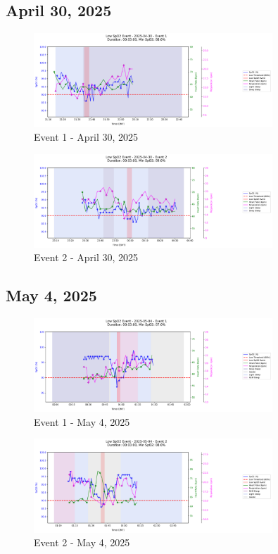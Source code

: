 \documentclass{article}
\begin{document}
\subsection{April 30, 2025}
\begin{figure}[htbp]
    \centering
    \includegraphics[width=0.8\textwidth]{images/2025-04-30_event_1.png}
    \caption{Event 1 - April 30, 2025}
\end{figure}
\begin{figure}[htbp]
    \centering
    \includegraphics[width=0.8\textwidth]{images/2025-04-30_event_2.png}
    \caption{Event 2 - April 30, 2025}
\end{figure}
\clearpage

\subsection{May 4, 2025}
\begin{figure}[htbp]
    \centering
    \includegraphics[width=0.8\textwidth]{images/2025-05-04_event_1.png}
    \caption{Event 1 - May 4, 2025}
\end{figure}
\begin{figure}[htbp]
    \centering
    \includegraphics[width=0.8\textwidth]{images/2025-05-04_event_2.png}
    \caption{Event 2 - May 4, 2025}
\end{figure}
\clearpage
\end{document}
